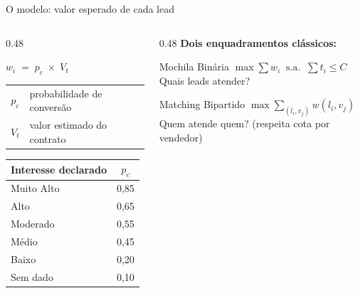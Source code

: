 \documentclass[aspectratio=169,11pt]{beamer}
\begin{document}
\begin{frame}{O modelo: valor esperado de cada lead}
\begin{columns}[c]

\begin{column}{0.48\textwidth}
  \begin{center}
    \vspace{0.6em}
    {\Large $w_i \;=\; p_c \;\times\; V_t$}\\[1.0em]
    \small
    \begin{tabular}{cl}
      $p_c$ & probabilidade de convers\~{a}o \\[2pt]
      $V_t$ & valor estimado do contrato \\
    \end{tabular}
  \end{center}

  \vspace{1.2em}
  \begin{center}
    \begin{tabular}{lc}
      \toprule
      Interesse declarado & $p_c$ \\
      \midrule
      Muito Alto & 0,85 \\
      Alto       & 0,65 \\
      Moderado   & 0,55 \\
      M\'{e}dio  & 0,45 \\
      Baixo      & 0,20 \\
      Sem dado   & 0,10 \\
      \bottomrule
    \end{tabular}
  \end{center}
\end{column}

\begin{column}{0.48\textwidth}
  \vspace{0.4em}
  \textbf{Dois enquadramentos cl\'{a}ssicos:}

  \vspace{0.8em}
  \begin{block}{Mochila Bin\'{a}ria}
    \centering
    $\max \displaystyle\sum w_i \;\;\text{s.a.}\;\; \sum t_i \leq C$\\[2pt]
    \small Quais leads atender?
  \end{block}

  \vspace{0.6em}
  \begin{alertblock}{Matching Bipartido}
    \centering
    $\max \displaystyle\sum_{(l_i,v_j)} w(l_i,v_j)$\\[2pt]
    \small Quem atende quem? (respeita cota por vendedor)
  \end{alertblock}
\end{column}

\end{columns}
\end{frame}
\end{document}
